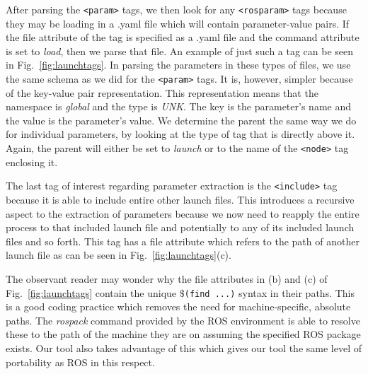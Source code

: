 After parsing the \texttt{<param>} tags, we then look for any \texttt{<rosparam>} tags because they may be loading in a .yaml file which will contain parameter-value pairs. If the file attribute of the tag is specified as a .yaml file and the command attribute is set to \emph{load}, then we parse that file. An example of just such a tag can be seen in Fig.~\ref{fig:launchtags}. In parsing the parameters in these types of files, we use the same schema as we did for the \texttt{<param>} tags. It is, however, simpler because of the key-value pair representation. This representation means that the namespace is \emph{global} and the type is \emph{UNK}. The key is the parameter's name and the value is the parameter's value. We determine the parent the same way we do for individual parameters, by looking at the type of tag that is directly above it. Again, the parent will either be set to \emph{launch} or to the name of the \texttt{<node>} tag enclosing it.

The last tag of interest regarding parameter extraction is the \texttt{<include>} tag because it is able to include entire other launch files. This introduces a recursive aspect to the extraction of parameters because we now need to reapply the entire process to that included launch file and potentially to any of its included launch files and so forth. This tag has a file attribute which refers to the path of another launch file as can be seen in Fig.~\ref{fig:launchtags}(c).

The observant reader may wonder why the file attributes in (b) and (c) of Fig.~\ref{fig:launchtags} contain the unique \texttt{$\$$(find ...)} syntax in their paths. This is a good coding practice which removes the need for machine-specific, absolute paths. The \emph{rospack} command provided by the ROS environment is able to resolve these to the path of the machine they are on assuming the specified ROS package exists. Our tool also takes advantage of this which gives our tool the same level of portability as ROS in this respect.


%



%

